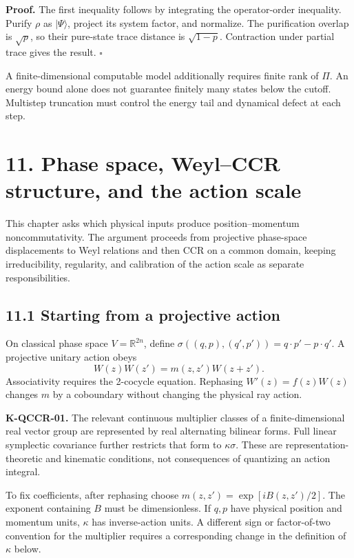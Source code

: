 \documentclass[
  11pt,
  oneside]{book}
\begin{document}
\textbf{Proof.} The first inequality follows by integrating the
operator-order inequality. Purify \(\rho\) as \(|\Psi\rangle\), project
its system factor, and normalize. The purification overlap is
\(\sqrt p\), so their pure-state trace distance is \(\sqrt{1-p}\).
Contraction under partial trace gives the result. \(\square\)

A finite-dimensional computable model additionally requires finite rank
of \(\Pi\). An energy bound alone does not guarantee finitely many
states below the cutoff. Multistep truncation must control the energy
tail and dynamical defect at each step.

\chapter{11. Phase space, Weyl--CCR structure, and the action
scale}\label{ch-11}

This chapter asks which physical inputs produce position--momentum
noncommutativity. The argument proceeds from projective phase-space
displacements to Weyl relations and then CCR on a common domain, keeping
irreducibility, regularity, and calibration of the action scale as
separate responsibilities.

\section{11.1 Starting from a projective action}

On classical phase space \(V=\mathbb R^{2n}\), define
\(\sigma((q,p),(q',p'))=q\cdot p'-p\cdot q'\). A projective unitary
action obeys \[
W(z)W(z')=m(z,z')W(z+z').
\] Associativity requires the 2-cocycle equation. Rephasing
\(W'(z)=f(z)W(z)\) changes \(m\) by a coboundary without changing the
physical ray action.

\textbf{K-QCCR-01.} The relevant continuous multiplier classes of a
finite-dimensional real vector group are represented by real alternating
bilinear forms. Full linear symplectic covariance further restricts that
form to \(\kappa\sigma\). These are representation-theoretic and
kinematic conditions, not consequences of quantizing an action integral.

To fix coefficients, after rephasing choose
\(m(z,z')=\exp[iB(z,z')/2]\). The exponent containing \(B\) must be
dimensionless. If \(q,p\) have physical position and momentum units,
\(\kappa\) has inverse-action units. A different sign or factor-of-two
convention for the multiplier requires a corresponding change in the
definition of \(\kappa\) below.
\end{document}
